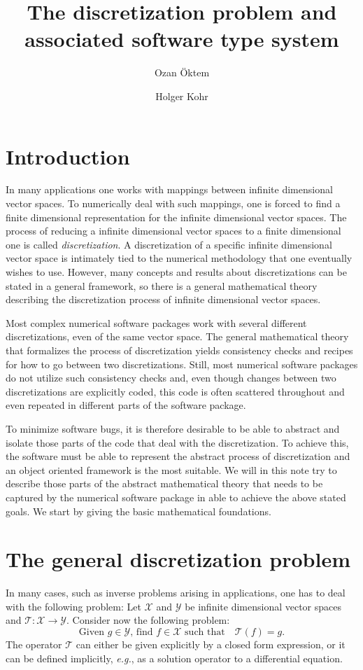 \documentclass[a4paper]{paper}
\title{The discretization problem and associated software type system}
\author{Ozan \"Oktem \and Holger Kohr}
\newcommand{\VecSpace}[1]{\mathscr{#1}}
\newcommand{\Op}[1]{\mathcal{#1}}
\newcommand{\eg}{\textsl{e.g.}\xspace}
\begin{document}
\maketitle

\section{Introduction}
In many applications one works with mappings between infinite dimensional vector spaces.
To numerically deal with such mappings, one is forced to find a finite dimensional 
representation for the infinite dimensional vector spaces. The process of reducing a
infinite dimensional vector spaces to a finite dimensional one is called \emph{discretization}.
A discretization of a specific infinite dimensional vector space is intimately 
tied to the numerical methodology that one eventually wishes to use. However, many concepts
and results about  discretizations can be stated in a general framework, so there is 
a general mathematical theory describing the discretization process of infinite dimensional 
vector spaces.  

Most complex numerical software packages work with several 
different discretizations, even of the same vector space. The general mathematical 
theory that formalizes the process of discretization yields consistency 
checks and recipes for how to go between two discretizations. Still, most numerical software 
packages do not utilize such consistency checks and, even though changes between two 
discretizations are explicitly coded, this code is often scattered throughout  and even 
repeated in different parts of the software package.  

To minimize software bugs, it is therefore desirable to be able to abstract and isolate those parts 
of the code that deal with the discretization. To achieve this, the software must be able to represent 
the abstract process of
discretization and an object oriented framework is the most suitable. We will in this note try 
to describe those parts of the abstract mathematical theory that needs to be captured by 
the numerical software package in able to achieve the above stated goals. We  start 
by giving the basic mathematical foundations.


\section{The general discretization problem}
In many cases, such as inverse problems arising in applications,  one has to deal with 
the following problem: Let $\VecSpace{X}$ and $\VecSpace{Y}$ be infinite dimensional vector spaces and 
$\Op{T} \colon \VecSpace{X} \to \VecSpace{Y}$. Consider now the following problem:
\begin{equation}\label{eq:OpEq}
   \text{Given $g\in \VecSpace{Y}$, find $f\in \VecSpace{X}$ such that}\quad \Op{T}(f)=g. 
\end{equation}
The operator $\Op{T}$ can either be given explicitly by a closed form expression, or it can be defined 
implicitly, \eg, as a solution operator to a differential equation. 
\end{document}
